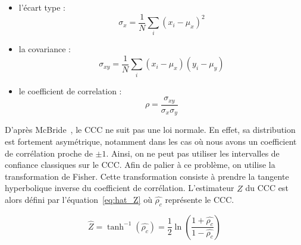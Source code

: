 \begin{itemize}
  \item l'écart type :
  \begin{equation}
      \sigma_x = \dfrac{1}{N} \sum_{i} \left(x_i - \mu_x\right)^2
  \end{equation}

  \item la covariance :
  \begin{equation}
    \sigma_{xy} = \dfrac{1}{N} \sum_{i} \left(x_i - \mu_x\right)\left(y_i - \mu_y\right)
  \end{equation}

  \item le coefficient de correlation :
  \begin{equation}
    \rho = \dfrac{\sigma_{xy}}{\sigma_{x} \sigma_{y} }
  \end{equation}
\end{itemize}

D'après McBride~\cite{McBride2005}, le CCC ne suit pas une loi normale. En effet, sa distribution est fortement asymétrique, notamment dans les cas où nous avons un coefficient de corrélation proche de $\pm 1$.
Ainsi, on ne peut pas utiliser les intervalles de confiance classiques sur le CCC.
Afin de palier à ce problème, on utilise la transformation de Fisher.
Cette transformation consiste à prendre la tangente hyperbolique inverse du coefficient de corrélation.
L'estimateur $\hat{Z}$ du CCC est alors défini par l'équation~\ref{eq:hat_Z} où $\hat{\rho_c}$ représente le CCC.



\begin{equation}
  \hat{Z} = \tanh^{-1}(\hat{\rho_c}) =  \dfrac{1}{2} \ln \left( \dfrac{1+ \hat{\rho_c} }{1 -\hat{\rho_c}}  \right)
  \label{eq:hat_Z}
\end{equation}

